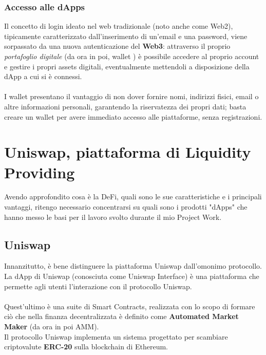 \documentclass[12pt,a4paper]{report}
\begin{document}
\subsection{Accesso alle dApps}

Il concetto di login ideato nel web tradizionale (noto anche come Web2), tipicamente caratterizzato dall'inserimento di un'email e una password, viene sorpassato da una nuova autenticazione del \textbf{Web3}\cite{web2_web3}: attraverso il proprio \textit{portafoglio digitale} (da ora in poi, wallet \cite{wallet}) è possibile accedere al proprio account e gestire i propri assets digitali, eventualmente mettendoli a disposizione della dApp a cui si è connessi.
\\\\I wallet presentano il vantaggio di non dover fornire nomi, indirizzi fisici, email o altre informazioni personali, garantendo la riservatezza dei propri dati; basta creare un wallet per avere immediato accesso alle piattaforme, senza registrazioni.



\chapter{Uniswap, piattaforma di Liquidity Providing}

Avendo approfondito cosa è la DeFi, quali sono le sue caratteristiche e i principali vantaggi, ritengo necessario concentrarsi su quali sono i prodotti "dApps" che hanno messo le basi per il lavoro svolto durante il mio Project Work.

\section{Uniswap}

Innanzitutto, è bene distinguere la piattaforma Uniswap\cite{uniswap} dall'omonimo protocollo.
\\La dApp di Uniswap (conosciuta come Uniswap Interface) è una piattaforma che permette agli utenti l'interazione con il protocollo Uniswap.
\\\\Quest'ultimo è una suite di Smart Contracts, realizzata con lo scopo di formare ciò che nella finanza decentralizzata è definito come \textbf{Automated Market Maker} (da ora in poi AMM\cite{amm}).
\\Il protocollo Uniswap implementa un sistema progettato per scambiare criptovalute \textbf{ERC-20} sulla blockchain di Ethereum. 
\end{document}
